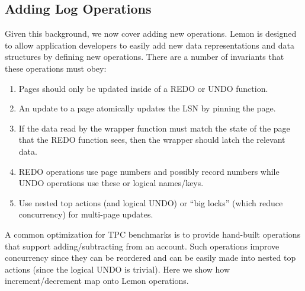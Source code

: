 \documentclass[10pt,letterpaper,twocolumn,english]{article}
\newcommand{\yad}{Lemon\xspace}
\begin{document}
\subsection{Adding Log Operations}
\label{op-def}


Given this background, we now cover adding new operations. \yad is
designed to allow application developers to easily add new data
representations and data structures by defining new operations.
There are a number of invariants that these operations must obey:
\begin{enumerate}
\item Pages should only be updated inside of a REDO or UNDO function.
\item An update to a page atomically updates the LSN by pinning the page.
\item If the data read by the wrapper function must match the state of
the page that the REDO function sees, then the wrapper should latch
the relevant data.
\item REDO operations use page numbers and possibly record numbers
while UNDO operations use these or logical names/keys.
\item Use nested top actions (and logical UNDO) 
or ``big locks'' (which reduce concurrency) for multi-page updates.
\end{enumerate}


A common optimization for TPC benchmarks is to provide hand-built
operations that support adding/subtracting from an account.  Such
operations improve concurrency since they can be reordered and can be
easily made into nested top actions (since the logical UNDO is
trivial). Here we show how increment/decrement map onto \yad operations.
\end{document}
